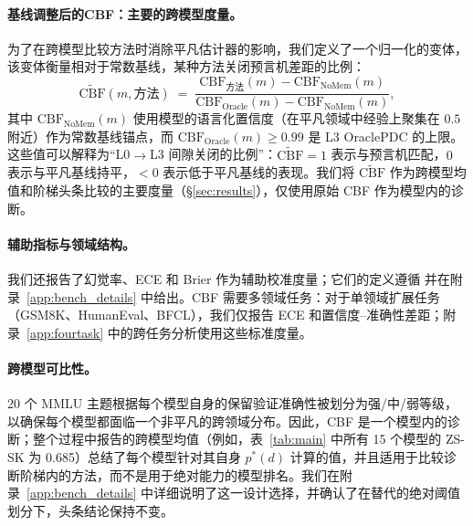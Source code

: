 \documentclass[11pt,a4paper,fontset=fandol]{ctexart}
\begin{document}
\paragraph{基线调整后的CBF：主要的跨模型度量。} 为了在跨模型比较方法时消除平凡估计器的影响，我们定义了一个归一化的变体，该变体衡量相对于常数基线，某种方法关闭预言机差距的比例：
\begin{equation}
  \widetilde{\text{CBF}}(m, \text{方法}) \;=\; \frac{\text{CBF}_{\text{方法}}(m) - \text{CBF}_{\text{NoMem}}(m)}{\text{CBF}_{\text{Oracle}}(m) - \text{CBF}_{\text{NoMem}}(m)},
  \label{eq:adj_cbf}
\end{equation}
其中 $\text{CBF}_{\text{NoMem}}(m)$ 使用模型的语言化置信度（在平凡领域中经验上聚集在 $0.5$ 附近）作为常数基线锚点，而 $\text{CBF}_{\text{Oracle}}(m) \!\geq\! 0.99$ 是 L3 OraclePDC 的上限。这些值可以解释为“L0$\to$L3 间隙关闭的比例”：$\widetilde{\text{CBF}}=1$ 表示与预言机匹配，$0$ 表示与平凡基线持平，$<0$ 表示低于平凡基线的表现。我们将 $\widetilde{\text{CBF}}$ 作为跨模型均值和阶梯头条比较的主要度量（\S\ref{sec:results}），仅使用原始 CBF 作为模型内的诊断。

\paragraph{辅助指标与领域结构。} 我们还报告了幻觉率、ECE 和 Brier 作为辅助校准度量；它们的定义遵循 \citet{guo2017calibration} 并在附录~\ref{app:bench_details} 中给出。CBF 需要多领域任务：对于单领域扩展任务（GSM8K、HumanEval、BFCL），我们仅报告 ECE 和置信度--准确性差距；附录~\ref{app:fourtask} 中的跨任务分析使用这些标准度量。

\paragraph{跨模型可比性。} 20 个 MMLU 主题根据每个模型自身的保留验证准确性被划分为强/中/弱等级，以确保每个模型都面临一个非平凡的跨领域分布。因此，CBF 是一个模型内的诊断；整个过程中报告的跨模型均值（例如，表~\ref{tab:main} 中所有 15 个模型的 ZS-SK 为 0.685）总结了每个模型针对其自身 $p^*(d)$ 计算的值，并且适用于比较诊断阶梯内的方法，而不是用于绝对能力的模型排名。我们在附录~\ref{app:bench_details} 中详细说明了这一设计选择，并确认了在替代的绝对阈值划分下，头条结论保持不变。
\end{document}
